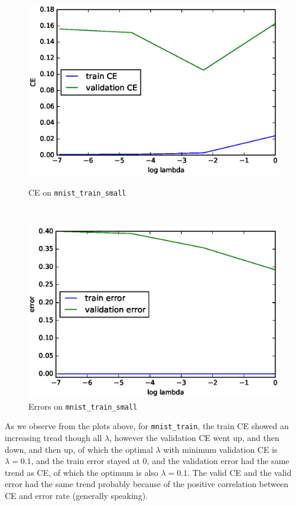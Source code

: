 \documentclass[10pt]{article}
\begin{document}
\begin{figure}[H]
\centering
\begin{minipage}[b]{0.45\textwidth}
\centering
\includegraphics[scale=.5]{plot_small_ce_pen.eps}
\caption{CE on \texttt{mnist\_train\_small}}
\label{plot_small_ce_pen}
\end{minipage}
\
\begin{minipage}[b]{0.45\textwidth}
\centering
\includegraphics[scale=.5]{plot_small_err_pen.eps}
\caption{Errors on \texttt{mnist\_train\_small}}
\label{plot_small_err_pen}
\end{minipage}
\end{figure}
As we observe from the plots above, for \texttt{mnist\_train}, the train CE showed an increasing tread though all $\lambda$, however the validation CE went up, and then down, and then up, of which the optimal $\lambda$ with minimum validation CE is $\lambda = 0.1$, and the train error stayed at $0$, and the validation error had the same trend as CE, of which the optimum is also $\lambda = 0.1$. The valid CE and the valid error had the same trend probably because of the positive correlation between CE and error rate (generally speaking).\par
\end{document}
